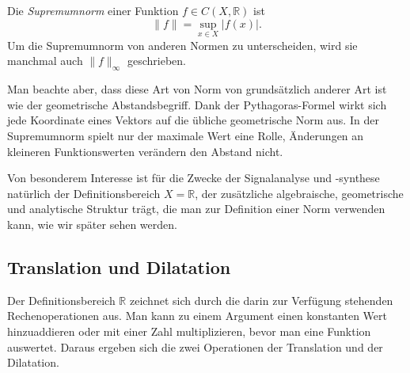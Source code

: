 \begin{definition}
Die {\em Supremumnorm} einer Funktion $f\in C(X,\mathbb R)$ ist
%
\[
\|f\| = \sup_{x\in X} |f(x)|.
\]
Um die Supremumnorm von anderen Normen zu unterscheiden, wird sie
manchmal auch $\|f\|_{\infty}$ geschrieben.
\end{definition}

Man beachte aber, dass diese Art von Norm von grundsätzlich anderer Art
ist wie der geometrische Abstandsbegriff.
Dank der Pythagoras-Formel wirkt sich jede Koordinate eines Vektors 
auf die übliche geometrische Norm aus.
In der Supremumnorm spielt nur der maximale Wert eine Rolle,
Änderungen an kleineren Funktionswerten verändern den Abstand nicht.

Von besonderem Interesse ist für die Zwecke der Signalanalyse und
-synthese natürlich der Definitionsbereich $X=\mathbb{R}$, der
zusätzliche algebraische, geometrische und analytische Struktur trägt, die man
zur Definition einer Norm verwenden kann, wie wir später sehen werden.

\subsection{Translation und Dilatation\label{subsection:translation-dilatation}}
Der Definitionsbereich $\mathbb R$ zeichnet sich durch die darin zur
Verfügung stehenden Rechenoperationen aus.
Man kann zu einem Argument einen konstanten Wert hinzuaddieren oder mit
einer Zahl multiplizieren, bevor man eine Funktion auswertet.
Daraus ergeben sich die zwei Operationen der Translation und der Dilatation.
%
%

